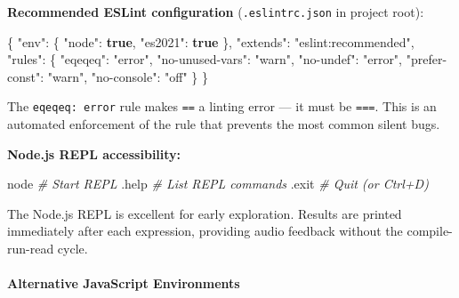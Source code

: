 \documentclass[
  justified,
  openright,
]{tufte-book}
\let\subsection\paragraph
\let\paragraph\paragraph
\newcommand{\KeywordTok}[1]{\textcolor{CodeKeyword}{\textbf{#1}}}  %
\newcommand{\StringTok}[1]{\textcolor{CodeString}{#1}}              %
\newcommand{\CommentTok}[1]{\textcolor{CodeComment}{\textit{#1}}}  %
\newcommand{\CodeFuncTok}[1]{\textcolor{CodeKeyword}{#1}}           %
\newcommand{\CodeTypeTok}[1]{\textcolor{CodeType}{#1}}              %
\newenvironment{Shaded}{%
  \begin{mdframed}[style=TufteCode]%
}{%
  \end{mdframed}%
}
\let\subsection\paragraph
\let\paragraph\paragraph
\begin{document}
\textbf{Recommended ESLint configuration} (\texttt{.eslintrc.json} in
project root):

\begin{Shaded}
\begin{Highlighting}[]
\CodeFuncTok{\{}
  \CodeTypeTok{"env"}\CodeFuncTok{:} \CodeFuncTok{\{} \CodeTypeTok{"node"}\CodeFuncTok{:} \KeywordTok{true}\CodeFuncTok{,} \CodeTypeTok{"es2021"}\CodeFuncTok{:} \KeywordTok{true} \CodeFuncTok{\},}
  \CodeTypeTok{"extends"}\CodeFuncTok{:} \StringTok{"eslint:recommended"}\CodeFuncTok{,}
  \CodeTypeTok{"rules"}\CodeFuncTok{:} \CodeFuncTok{\{}
    \CodeTypeTok{"eqeqeq"}\CodeFuncTok{:} \StringTok{"error"}\CodeFuncTok{,}
    \CodeTypeTok{"no{-}unused{-}vars"}\CodeFuncTok{:} \StringTok{"warn"}\CodeFuncTok{,}
    \CodeTypeTok{"no{-}undef"}\CodeFuncTok{:} \StringTok{"error"}\CodeFuncTok{,}
    \CodeTypeTok{"prefer{-}const"}\CodeFuncTok{:} \StringTok{"warn"}\CodeFuncTok{,}
    \CodeTypeTok{"no{-}console"}\CodeFuncTok{:} \StringTok{"off"}
  \CodeFuncTok{\}}
\CodeFuncTok{\}}
\end{Highlighting}
\end{Shaded}

The \texttt{eqeqeq:\ error} rule makes \texttt{==} a linting error ---
it must be \texttt{===}. This is an automated enforcement of the rule
that prevents the most common silent bugs.

\textbf{Node.js REPL accessibility:}

\begin{Shaded}
\begin{Highlighting}[]
node                      \CommentTok{\# Start REPL}
.help                     \CommentTok{\# List REPL commands}
.exit                     \CommentTok{\# Quit (or Ctrl+D)}
\end{Highlighting}
\end{Shaded}

The Node.js REPL is excellent for early exploration. Results are printed
immediately after each expression, providing audio feedback without the
compile-run-read cycle.

\subsection{Alternative JavaScript
Environments}\label{alternative-javascript-environments}
\end{document}
